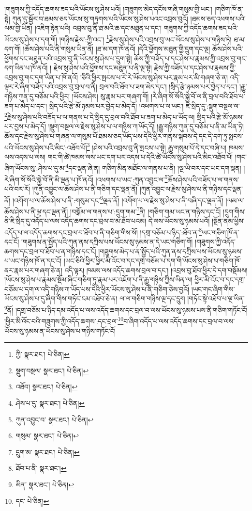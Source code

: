 །གཟུགས་ཀྱི་འདོད་ཆགས་ཟད་པའི་ཡོངས་སུ་ཤེས་པའོ། །གཟུགས་མེད་དངོས་གཞི་གསུམ་གྱི་ཡང་། །གཅིག་ཁོ་ན་སྟེ། ཀུན་དུ་སྦྱོར་བ་ཐམས་ཅད་ཡོངས་སུ་གཏུགས་པའི་ཡོངས་སུ་ཤེས་པའང་འབྲས་བུའོ། །ཐམས་ཅད་འཕགས་པའི་ལམ་གྱི་ཡིན། །འཇིག་རྟེན་པའི། འབྲས་བུ་ནི་ཐ་མའི་ཆ་དང་མཐུན་པ་དང་། གཟུགས་ཀྱི་འདོད་ཆགས་ཟད་པའི་ཡོངས་སུ་ཤེས་པ་དག་གོ། །གཉིས་རྗེས་:ཀྱི་འང་། \footnote{ཀྱི་  སྣར་ཐང་།  པེ་ཅིན། }རྗེས་སུ་ཤེས་པའི་འབྲས་བུ་ཡང་ཡོངས་སུ་ཤེས་པ་གཉིས་ཏེ། ཐ་མ་དག་གོ། །ཆོས་ཤེས་པའི་ནི་གསུམ་ཡིན་ནོ། །ཐ་མ་དག་ཁོ་ནའོ། །དེའི་ཕྱོགས་མཐུན་གྱི་དྲུག་དང་ལྔ། ཆོས་ཤེས་པའི་ཕྱོགས་དང་མཐུན་པའི་འབྲས་བུ་ནི་ཡོངས་སུ་ཤེས་པ་དྲུག་སྟེ། ཆོས་ཀྱི་བཟོད་པ་དང་ཤེས་པ་རྣམས་ཀྱི་འབྲས་བུ་གང་དག་ཡིན་པ་ཁོ་ནའོ། །
རྗེས་སུ་ཤེས་པའི་ཕྱོགས་དང་མཐུན་པ་ནི་ལྔ་སྟེ། རྗེས་ཀྱི་བཟོད་པ་དང་ཤེས་པ་རྣམས་ཀྱི་འབྲས་བུ་གང་དག་ཡིན་པ་ཁོ་ནའོ། །ཅིའི་ཕྱིར་སྤངས་པ་རེ་རེ་ཡོངས་སུ་ཤེས་པར་རྣམ་པར་མི་གཞག་ཅེ་ན། འདི་ལྟར་རེ་ཞིག་བཟོད་པའི་འབྲས་བུ་བྲལ་བ་ནི། བྲལ་བའི་ཐོབ་པ་ཟག་མེད་དང་། །སྲིད་རྩེ་ཉམས་པར་བྱེད་པ་དང་། །རྒྱུ་གཉིས་ཀུན་དུ་བཅོམ་པའི་ཕྱིར། །ཡོངས་ཤེས། སུ་རྣམ་པར་གཞག་གོ། །རེ་ཞིག་སོ་སོའི་སྐྱེ་བོ་ལ་ནི་བྲལ་བའི་ཐོབ་པ་ཟག་པ་མེད་པ་དང་། སྲིད་པའི་རྩེ་མོ་ཉམས་པར་བྱེད་པ་མེད་དོ། །འཕགས་པ་ལ་ཡང་། ཇི་སྲིད་དུ་:སྡུག་བསྔལ་ལ་\footnote{སྡུག་བསྔལ་  སྣར་ཐང་།  པེ་ཅིན། }རྗེས་སུ་ཤེས་པའི་བཟོད་པ་ལ་གནས་པ་དེ་སྲིད་དུ་བྲལ་བའི་ཐོབ་པ་ཟག་པ་མེད་པ་ཡོད་ལ། སྲིད་པའི་རྩེ་མོ་ཉམས་པར་བྱས་པ་མེད་དོ། །སྡུག་བསྔལ་ལ་རྗེས་སུ་ཤེས་པ་ལ་གཉིས་ཀ་ཡོད་དོ། །རྒྱུ་གཉིས་ཀུན་དུ་བཅོམ་པ་ནི་མ་ཡིན་ཏེ། ཆོས་དང་རྗེས་སུ་ཤེས་པ་གཞན་ལ་གསུམ་པོ་ཐམས་ཅད་ཡོད་པས་དེའི་ཕྱིར་གནས་སྐབས་དེ་དང་དེ་དག་ཏུ་སྤངས་པའི་ཡོངས་སུ་ཤེས་པའི་མིང་:འཐོབ་པོ།\footnote{འཐོབ།  སྣར་ཐང་།  པེ་ཅིན། } །ཤེས་པའི་འབྲས་བུ་ནི་སྤངས་པ་སྟེ། རྒྱུ་གསུམ་པོ་དེ་དང་བཞི་པ། ཁམས་ལས་འདས་པ་ལས། གང་གི་ཚེ་ཁམས་ལས་ཡང་དག་པར་འདས་པ་དེའི་ཚེ་ཡོངས་སུ་ཤེས་པའི་མིང་འཐོབ་པོ། །གང་ཞིག་ཡོངས་སུ་:ཤེས་པ་དུ་མ་\footnote{ཤེས་པ་དུ་  སྣར་ཐང་།  པེ་ཅིན། }དང་ལྡན་ཞེ་ན། གཅིག་མིན་མཐོང་ལ་གནས་པ་ནི། །ལྔ་ཡི་བར་དང་ཡང་དག་ལྡན། །རེ་ཞིག་སོ་སོའི་སྐྱེ་བོ་ནི་མི་ལྡན་པ་ཁོ་ནའོ། །འཕགས་པ་ཡང་:ཀུན་འབྱུང་ལ་\footnote{ཀུན་འབྱུང་བ་  སྣར་ཐང་།  པེ་ཅིན། }ཆོས་ཤེས་པའི་བཟོད་པ་ལ་གནས་པའི་བར་རོ། །ཀུན་འབྱུང་ལ་ཆོས་ཤེས་པ་ནི་གཅིག་དང་ལྡན་ནོ། །ཀུན་འབྱུང་ལ་རྗེས་སུ་ཤེས་པ་ནི་གཉིས་དང་ལྡན་ནོ། །འགོག་པ་ལ་ཆོས་ཤེས་པ་ནི་:གསུམ་དང་\footnote{གསུམ་  སྣར་ཐང་།  པེ་ཅིན། }ལྡན་ནོ། །འགོག་པ་ལ་རྗེས་སུ་ཤེས་པ་ནི་བཞི་དང་ལྡན་ནོ། །ལམ་ལ་ཆོས་ཤེས་པ་ནི་ལྔ་དང་ལྡན་ནོ། །བསྒོམ་ལ་གནས་པ་:དྲུག་གམ་\footnote{དྲུག་མ་  སྣར་ཐང་།  པེ་ཅིན། }ནི། །གཅིག་གམ་ཡང་ན་གཉིས་དང་ངོ། །དྲུག་གིས་ནི་ཇི་སྲིད་དུ་འདོད་པ་ལས་འདོད་ཆགས་དང་བྲལ་བ་མ་ཐོབ་པའམ། དེ་ལས་ཡོངས་སུ་ཉམས་པའོ། །སྔོན་ནམ་ཕྱིས་འདོད་པ་ལ་འདོད་ཆགས་དང་བྲལ་བ་ཐོབ་པ་ནི་གཅིག་གིས་སོ། །དགྲ་བཅོམ་པ་ཉིད་:ཐོབ་ན་\footnote{ཐོབ་པ་ནི་  སྣར་ཐང་། }ཡང་གཅིག་ཁོ་ན་དང་ངོ། །གཟུགས་ན་སྤྱོད་པའི་ཀུན་ནས་དཀྲིས་པས་ཡོངས་སུ་ཉམས་ན་དེ་ཡང་གཅིག་གོ། །གཟུགས་ཀྱི་འདོད་ཆགས་དང་བྲལ་བ་ཐོབ་པ་ན་གཉིས་དང་ངོ། །གཟུགས་མེད་པ་ན་སྤྱོད་པའི་ཀུན་ནས་དཀྲིས་པས་ཡོངས་སུ་ཉམས་པ་ཡང་གཉིས་ཁོ་ན་དང་ངོ། །ཡང་ཅིའི་ཕྱིར་ཕྱིར་མི་འོང་བ་དང་དགྲ་བཅོམ་པ་དག་གི་ཡོངས་སུ་ཤེས་པ་གཅིག་ཁོ་ནར་རྣམ་པར་གཞག་ཅེ་ན། འདི་ལྟར། ཁམས་ལས་འདོད་ཆགས་བྲལ་བ་དང་། །འབྲས་བུ་ཐོབ་ཕྱིར་དེ་དག་བསྡོམས། །ཡོངས་སུ་ཤེས་པ་རྣམས་སྡོམ་ཞིང་གཅིག་ཏུ་རྣམ་པར་འཇོག་པ་ནི་རྒྱུ་གཉིས་ཀྱིས་ཡིན་ལ། ཕྱིར་མི་འོང་བ་དང་དགྲ་བཅོམ་པ་དག་ལ་འདི་གཉིས་ཀ་ཡོད་པས་དེའི་ཕྱིར་ཡོངས་སུ་ཤེས་པ་ནི་གཅིག་ཅེས་བྱའོ། །ཡང་གང་ཞིག་གིས་ཡོངས་སུ་ཤེས་པ་དུ་ཞིག་གིས་གཏོང་ངམ་འཐོབ་ཅེ་ན། ལ་ལ་གཅིག་གཉིས་ལྔ་དང་དྲུག །གཏོང་སྟེ་འཐོབ་པ་ལྔ་ཡིན་\footnote{མིན་  སྣར་ཐང་།  པེ་ཅིན། }ནོ། །དགྲ་བཅོམ་པ་ཉིད་དམ་འདོད་པ་ལས་འདོད་ཆགས་དང་བྲལ་བ་ལས་ཡོངས་སུ་ཉམས་པས་ནི་གཅིག་གཏོང་ངོ། །ཕྱིར་མི་འོང་བའི་གཟུགས་ཀྱི་འདོད་ཆགས་:དང་བྲལ་\footnote{དང་  པེ་ཅིན། }བ་ཞིག་འདོད་པ་ལས་འདོད་ཆགས་དང་བྲལ་བ་ལས་ཡོངས་སུ་ཉམས་ན་ཡོངས་སུ་ཤེས་པ་གཉིས་གཏོང་ངོ། 